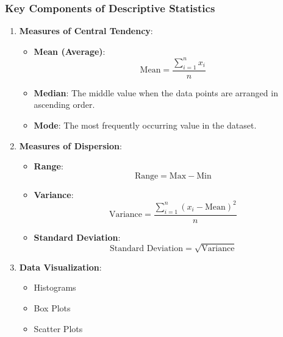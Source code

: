 \documentclass[aspectratio=169]{beamer}
\begin{document}
\begin{frame}[fragile]
    \frametitle{Key Components of Descriptive Statistics}
    \begin{enumerate}
        \item \textbf{Measures of Central Tendency}:
        \begin{itemize}
            \item \textbf{Mean (Average)}:
            \begin{equation}
            \text{Mean} = \frac{\sum_{i=1}^n x_i}{n}
            \end{equation}
            \item \textbf{Median}: The middle value when the data points are arranged in ascending order.
            \item \textbf{Mode}: The most frequently occurring value in the dataset.
        \end{itemize}
        
        \item \textbf{Measures of Dispersion}:
        \begin{itemize}
            \item \textbf{Range}:
            \begin{equation}
            \text{Range} = \text{Max} - \text{Min}
            \end{equation}
            \item \textbf{Variance}:
            \begin{equation}
            \text{Variance} = \frac{\sum_{i=1}^n (x_i - \text{Mean})^2}{n}
            \end{equation}
            \item \textbf{Standard Deviation}:
            \begin{equation}
            \text{Standard Deviation} = \sqrt{\text{Variance}}
            \end{equation}
        \end{itemize}
        
        \item \textbf{Data Visualization}:
        \begin{itemize}
            \item Histograms
            \item Box Plots
            \item Scatter Plots
        \end{itemize}
    \end{enumerate}
\end{frame}
\end{document}
